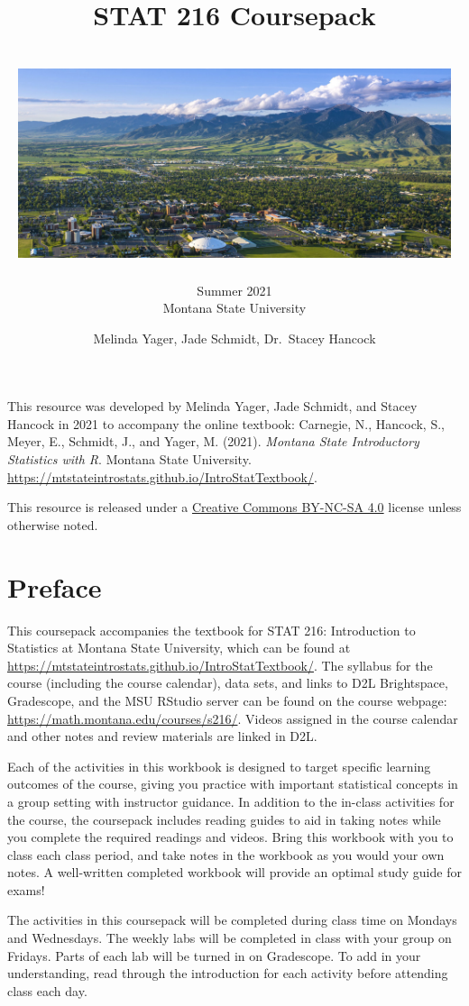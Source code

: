 \documentclass[
]{report}
\title{\textbf{STAT 216 Coursepack}\\
~\\
\includegraphics[width=5in,height=\textheight]{images/msu-campus.jpg}}
\subtitle{Summer 2021\\
Montana State University}
\author{Melinda Yager, Jade Schmidt, Dr.~Stacey Hancock}
\date{}
\begin{document}
\maketitle

\newpage
\thispagestyle{empty}

This resource was developed by Melinda Yager, Jade Schmidt, and Stacey Hancock in 2021 to accompany the online textbook: Carnegie, N., Hancock, S., Meyer, E., Schmidt, J., and Yager, M. (2021). \emph{Montana State Introductory Statistics with R}. Montana State University. \url{https://mtstateintrostats.github.io/IntroStatTextbook/}.

This resource is released under a \href{https://creativecommons.org/licenses/by-nc-sa/4.0/}{Creative Commons BY-NC-SA 4.0} license unless otherwise noted.

\setcounter{tocdepth}{1}
\tableofcontents
\thispagestyle{empty}

\newpage
\setcounter{page}{1}

\hypertarget{preface}{%
\chapter*{Preface}\label{preface}}

This coursepack accompanies the textbook for STAT 216: Introduction to Statistics at Montana State University, which can be found at \url{https://mtstateintrostats.github.io/IntroStatTextbook/}. The syllabus for the course (including the course calendar), data sets, and links to D2L Brightspace, Gradescope, and the MSU RStudio server can be found on the course webpage: \url{https://math.montana.edu/courses/s216/}.
Videos assigned in the course calendar and other notes and review materials are linked in D2L.

Each of the activities in this workbook is designed to target specific learning outcomes of the course, giving you practice with important statistical concepts in a group setting with instructor guidance. In addition to the in-class activities for the course, the coursepack includes reading guides to aid in taking notes while you complete the required readings and videos. Bring this workbook with you to class each class period, and take notes in the workbook as you would your own notes. A well-written completed workbook will provide an optimal study guide for exams!

The activities in this coursepack will be completed during class time on Mondays and Wednesdays. The weekly labs will be completed in class with your group on Fridays. Parts of each lab will be turned in on Gradescope. To add in your understanding, read through the introduction for each activity before attending class each day.
\end{document}
